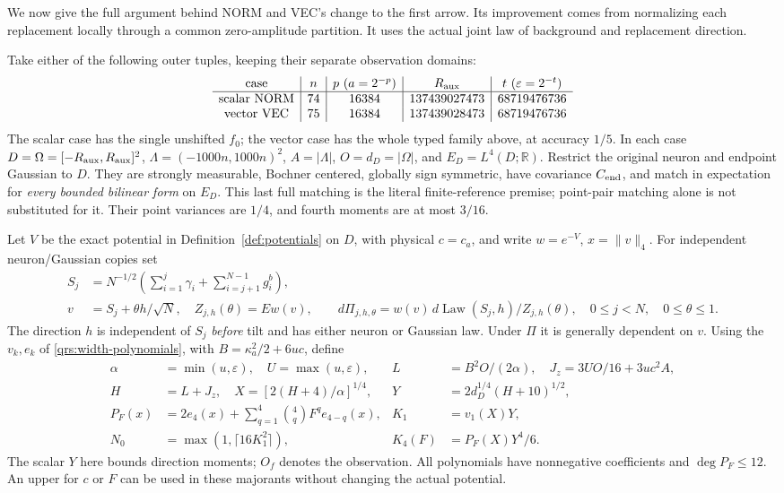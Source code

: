 \documentclass[11pt]{article}
\theoremstyle{plain}
\theoremstyle{definition}
\theoremstyle{remark}
\newcommand{\R}{\mathbb{R}}
\DeclareMathOperator{\Law}{Law}
\begin{document}
We now give the full argument behind NORM and VEC's change to the first
arrow. Its improvement comes from normalizing each replacement locally
through a common zero-amplitude partition. It uses the actual joint law
of background and replacement direction.

Take either of the following outer tuples, keeping their separate
observation domains:
\begin{equation}\label{vqal:outer}
 \begin{array}{c|c|c|c|c}
 \text{case}&n&p\ (a=2^{-p})&R_{\rm aux}&t\ (\varepsilon=2^{-t})\\\hline
 \text{scalar NORM}&74&16384&137439027473&68719476736\\
 \text{vector VEC}&75&16384&137439028473&68719476736
 \end{array}
\end{equation}
The scalar case has the single unshifted $f_0$; the vector case has the
whole typed family above, at accuracy $1/5$. In each case
$D=\Omega=[-R_{\rm aux},R_{\rm aux}]^2$,
$\Lambda=(-1000n,1000n)^2$, $A=|\Lambda|$, $O=d_D=|\Omega|$,
and $E_D=L^4(D;\R)$. Restrict the original neuron and endpoint Gaussian
to $D$. They are strongly measurable, Bochner centered, globally sign
symmetric, have covariance $C_{\rm end}$, and match in expectation for
\emph{every bounded bilinear form} on $E_D$. This last full matching is
the literal finite-reference premise; point-pair matching alone is not
substituted for it. Their point variances are $1/4$, and fourth moments
are at most $3/16$.

Let $V$ be the exact potential in Definition~\ref{def:potentials} on
$D$, with physical $c=c_a$, and write $w=e^{-V}$, $x=\|v\|_4$.
For independent neuron/Gaussian copies set
\begin{align}\label{vqal:joint}
 S_j&=N^{-1/2}\left(\sum_{i=1}^j\gamma_i+
                              \sum_{i=j+1}^{N-1}g_i^b\right),\nonumber\\
 v&=S_j+\theta h/\sqrt N,\quad Z_{j,h}(\theta)=Ew(v),\qquad
 d\Pi_{j,h,\theta}=w(v)\,d\Law(S_j,h)/Z_{j,h}(\theta),
 \quad 0\le j<N,\quad0\le\theta\le1.
\end{align}
The direction $h$ is independent of $S_j$ \emph{before} tilt and has
either neuron or Gaussian law. Under $\Pi$ it is generally dependent on
$v$. Using the $v_k,e_k$ of \eqref{qrs:width-polynomials}, with
$B=\kappa_a^2/2+6uc$, define
\begin{align}\label{vqal:relativeconstants}
 \alpha&=\min(u,\varepsilon),\quad U=\max(u,\varepsilon),
 &L&=B^2O/(2\alpha),\quad J_z=3UO/16+3uc^2A,\nonumber\\
 H&=L+J_z,\quad X=[2(H+4)/\alpha]^{1/4},
 &Y&=2d_D^{1/4}(H+10)^{1/2},\nonumber\\
 P_F(x)&=2e_4(x)+\sum_{q=1}^4\binom4q F^qe_{4-q}(x),
 &K_1&=v_1(X)Y,\nonumber\\
 N_0&=\max(1,\lceil16K_1^2\rceil),
 &K_4(F)&=P_F(X)Y^4/6.
\end{align}
The scalar $Y$ here bounds direction moments; $O_f$ denotes the
observation. All polynomials have nonnegative coefficients and
$\deg P_F\le12$. An upper for $c$ or $F$ can be used in these
majorants without changing the actual potential.
\end{document}
